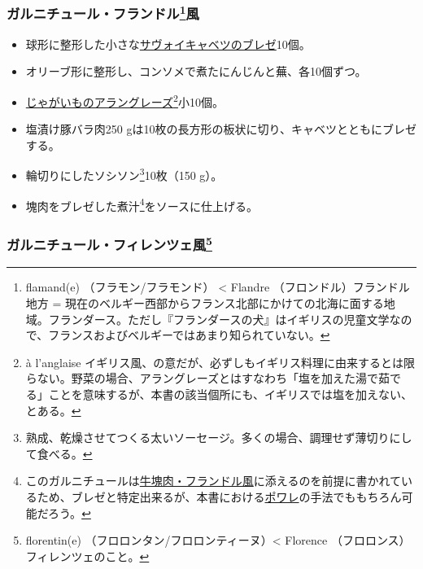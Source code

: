\begin{recette}
\hypertarget{garniture-a-la-flamande}{%
\subsubsection[ガルニチュール・フランドル風]{\texorpdfstring{ガルニチュール・フランドル\footnote{flamand(e)
  （フラモン/フラモンド） \textless{} Flandre
  （フロンドル）フランドル地方 =
  現在のベルギー西部からフランス北部にかけての北海に面する地域。フランダース。ただし『フランダースの犬』はイギリスの児童文学なので、フランスおよびベルギーではあまり知られていない。}風}{ガルニチュール・フランドル風}}\label{garniture-a-la-flamande}}



\begin{itemize}
\item
  球形に整形した小さな\protect\hyperlink{chou-braise}{サヴォイキャベツのブレゼ}10個。
\item
  オリーブ形に整形し、コンソメで煮たにんじんと蕪、各10個ずつ。
\item
  \protect\hyperlink{pommes-de-terres-a-l-anglaise}{じゃがいものアラングレーズ}\footnote{à
    l'anglaise
    イギリス風、の意だが、必ずしもイギリス料理に由来するとは限らない。野菜の場合、アラングレーズとはすなわち「塩を加えた湯で茹でる」ことを意味するが、本書の該当個所にも、イギリスでは塩を加えない、とある。}小10個。
\item
  塩漬け豚バラ肉250
  gは10枚の長方形の板状に切り、キャベツとともにブレゼする。
\item
  輪切りにしたソシソン\footnote{熟成、乾燥させてつくる太いソーセージ。多くの場合、調理せず薄切りにして食べる。}10枚（150
  g）。
\item
  塊肉をブレゼした煮汁\footnote{このガルニチュールは\protect\hyperlink{piece-de-boeuf-a-la-flammande}{牛塊肉・フランドル風}に添えるのを前提に書かれているため、ブレゼと特定出来るが、本書における\protect\hyperlink{les-poeles}{ポワレ}の手法でももちろん可能だろう。}をソースに仕上げる。
\end{itemize}

\hypertarget{garniture-a-la-florentine}{%
\subsubsection[ガルニチュール・フィレンツェ風]{\texorpdfstring{ガルニチュール・フィレンツェ風\footnote{florentin(e)
  （フロロンタン/フロロンティーヌ）\textless{} Florence
  （フロロンス）フィレンツェのこと。}}{ガルニチュール・フィレンツェ風}}\label{garniture-a-la-florentine}}


\end{recette}
